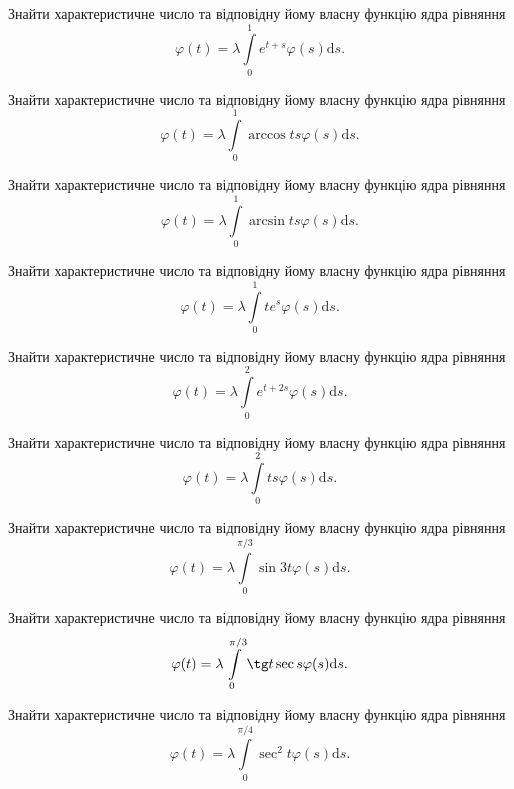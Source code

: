 \documentclass[12pt]{extarticle}
\begin{document}
\begin{Exercise}
Знайти характеристичне число та відповідну йому власну функцію ядра рівняння \[\varphi(t) = \lambda\int\limits_{0}^{1} e^{t+s} \varphi(s) \mathrm{d}s.\]
\end{Exercise}

\begin{Exercise}
Знайти характеристичне число та відповідну йому власну функцію ядра рівняння \[\varphi(t) = \lambda\int\limits_{0}^{1} \arccos t s \varphi(s) \mathrm{d}s.\]
\end{Exercise}

\begin{Exercise}
Знайти характеристичне число та відповідну йому власну функцію ядра рівняння \[\varphi(t) = \lambda\int\limits_{0}^{1} \arcsin t s \varphi(s) \mathrm{d}s.\]
\end{Exercise}

\begin{Exercise}
Знайти характеристичне число та відповідну йому власну функцію ядра рівняння \[\varphi(t) = \lambda\int\limits_{0}^{1} t e^s \varphi(s) \mathrm{d}s.\]
\end{Exercise}

\begin{Exercise}
Знайти характеристичне число та відповідну йому власну функцію ядра рівняння \[\varphi(t) = \lambda\int\limits_{0}^{2} e^{t+2s} \varphi(s) \mathrm{d}s.\]
\end{Exercise}

\begin{Exercise}
Знайти характеристичне число та відповідну йому власну функцію ядра рівняння \[\varphi(t) = \lambda\int\limits_{0}^{2} ts \varphi(s) \mathrm{d}s.\]
\end{Exercise}

\begin{Exercise}
Знайти характеристичне число та відповідну йому власну функцію ядра рівняння \[\varphi(t) = \lambda\int\limits_{0}^{\pi/3} \sin 3t \varphi(s) \mathrm{d}s.\]
\end{Exercise}

\begin{Exercise}
Знайти характеристичне число та відповідну йому власну функцію ядра рівняння \[\varphi(t) = \lambda\int\limits_{0}^{\pi/3} \tg t \sec s \varphi(s) \mathrm{d}s.\]
\end{Exercise}

\begin{Exercise}
Знайти характеристичне число та відповідну йому власну функцію ядра рівняння \[\varphi(t) = \lambda\int\limits_{0}^{\pi/4} \sec^2 t \varphi(s) \mathrm{d}s.\]
\end{Exercise}
\end{document}
